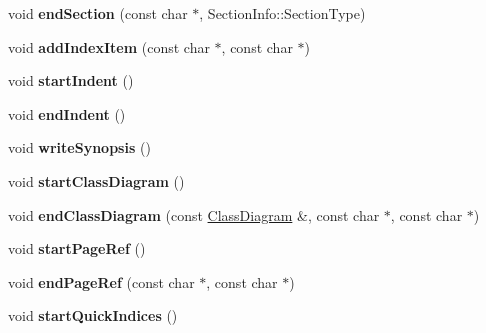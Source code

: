 \begin{DoxyCompactItemize}
\item 
\hypertarget{class_html_generator_ab32c634e6ee9223b4c5d77b1e3d8c082}{void {\bfseries end\-Section} (const char $\ast$, Section\-Info\-::\-Section\-Type)}\label{class_html_generator_ab32c634e6ee9223b4c5d77b1e3d8c082}

\item 
\hypertarget{class_html_generator_a6a680849ac320b2cbb670773aa5c9feb}{void {\bfseries add\-Index\-Item} (const char $\ast$, const char $\ast$)}\label{class_html_generator_a6a680849ac320b2cbb670773aa5c9feb}

\item 
\hypertarget{class_html_generator_a34fb23b9705fd9c97bfb8730b5667822}{void {\bfseries start\-Indent} ()}\label{class_html_generator_a34fb23b9705fd9c97bfb8730b5667822}

\item 
\hypertarget{class_html_generator_a3e925c49464a35005365e14899e6c0a8}{void {\bfseries end\-Indent} ()}\label{class_html_generator_a3e925c49464a35005365e14899e6c0a8}

\item 
\hypertarget{class_html_generator_acba0caaf7ea5f4acb9b4bf3ccbf2ee68}{void {\bfseries write\-Synopsis} ()}\label{class_html_generator_acba0caaf7ea5f4acb9b4bf3ccbf2ee68}

\item 
\hypertarget{class_html_generator_ab9f199144725218464219039e2e7284e}{void {\bfseries start\-Class\-Diagram} ()}\label{class_html_generator_ab9f199144725218464219039e2e7284e}

\item 
\hypertarget{class_html_generator_a723ed80335c8a31791b12302cf6f9cc5}{void {\bfseries end\-Class\-Diagram} (const \hyperlink{class_class_diagram}{Class\-Diagram} \&, const char $\ast$, const char $\ast$)}\label{class_html_generator_a723ed80335c8a31791b12302cf6f9cc5}

\item 
\hypertarget{class_html_generator_acb1f8019fc7ab54bdba19c92ef4a223d}{void {\bfseries start\-Page\-Ref} ()}\label{class_html_generator_acb1f8019fc7ab54bdba19c92ef4a223d}

\item 
\hypertarget{class_html_generator_a0e845e76703cf2a22b8c801febfe14c8}{void {\bfseries end\-Page\-Ref} (const char $\ast$, const char $\ast$)}\label{class_html_generator_a0e845e76703cf2a22b8c801febfe14c8}

\item 
\hypertarget{class_html_generator_a1003d38afed51e3e932a61be3b2d71a4}{void {\bfseries start\-Quick\-Indices} ()}\label{class_html_generator_a1003d38afed51e3e932a61be3b2d71a4}


\end{DoxyCompactItemize}
